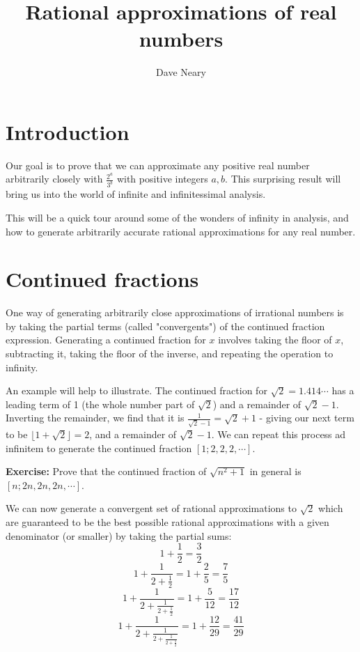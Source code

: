 \documentclass{article}
\begin{document}
\title{Rational approximations of real numbers}
\author{Dave Neary}

\maketitle

\section{Introduction}

Our goal is to prove that we can approximate any positive real number arbitrarily closely
with $\frac{2^a}{3^b}$ with positive integers $a,b$. This surprising result will bring us
into the world of infinite and infinitessimal analysis.

This will be a quick tour around some of the wonders of infinity in analysis, and how to
generate arbitrarily accurate rational approximations for any real number.

\section{Continued fractions}

One way of generating arbitrarily close approximations of irrational numbers is by taking
the partial terms (called "convergents") of the continued fraction expression. Generating
a continued fraction for $x$ involves taking the floor of $x$, subtracting it, taking the
floor of the inverse, and repeating the operation to infinity.

An example will help to illustrate. The continued fraction for $\sqrt{2} = 1.414\cdots$ has
a leading term of 1 (the whole number part of $\sqrt{2}$) and a remainder of $\sqrt{2}-1$.
Inverting the remainder, we find that it is $\frac{1}{\sqrt{2}-1} = \sqrt{2}+1$ - giving
our next term to be $\lfloor 1+\sqrt{2}\rfloor = 2$, and a remainder of $\sqrt{2}-1$.
We can repeat this process ad infinitem to generate the continued fraction 
$\left[1;2,2,2,\cdots\right]$.

\textbf{Exercise:} Prove that the continued fraction of $\sqrt{n^2+1}$ in general is 
$\left[n;2n,2n,2n,\cdots\right]$.

We can now generate a convergent set of rational approximations to $\sqrt{2}$ which are
guaranteed to be the best possible rational approximations with a given denominator (or
smaller) by taking the partial sums:
\[ 1+\frac{1}{2} = \frac{3}{2}\]
\[ 1+\frac{1}{2+\frac{1}{2}} = 1+\frac{2}{5} = \frac{7}{5} \]
\[ 1+\frac{1}{2+\frac{1}{2+\frac{1}{2}}} = 1+\frac{5}{12} = \frac{17}{12} \]
\[ 1+\frac{1}{2+\frac{1}{2+\frac{1}{2 + \frac{1}{2}}}} = 1+\frac{12}{29} = \frac{41}{29} \]
\end{document}
